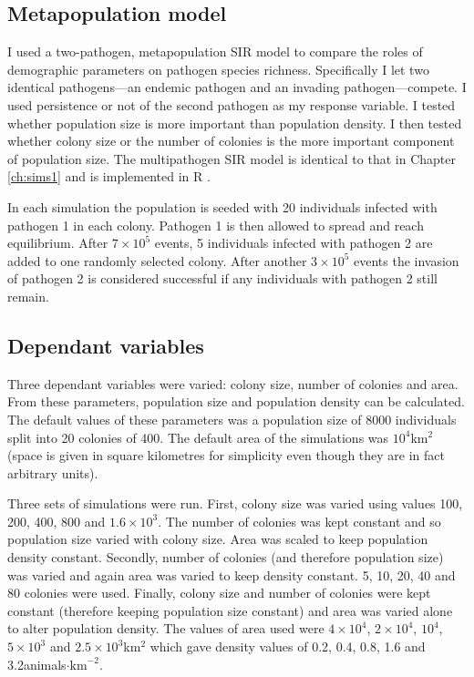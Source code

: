 \subsection{Metapopulation model}



I used a two-pathogen, metapopulation SIR model to compare the roles of demographic parameters on pathogen species richness.
Specifically I let two identical pathogens---an endemic pathogen and an invading pathogen---compete.
I used persistence or not of the second pathogen as my response variable.
I tested whether population size is more important than population density.
I then tested whether colony size or the number of colonies is the more important component of population size.
The multipathogen SIR model is identical to that in Chapter \ref{ch:sims1} and is implemented in R \cite{R}.



In each simulation the population is seeded with 20 individuals infected with pathogen 1 in each colony. 
Pathogen 1 is then allowed to spread and reach equilibrium. 
After \ensuremath{7\times 10^{5}} events, 5 individuals infected with pathogen 2 are added to one randomly selected colony. 
After another \ensuremath{3\times 10^{5}} events the invasion of pathogen 2 is considered successful if any individuals with pathogen 2 still remain.

\subsection{Dependant variables}

Three dependant variables were varied: colony size, number of colonies and area.
From these parameters, population size and population density can be calculated.
The default values of these parameters was a population size of 8000 individuals split into 20 colonies of 400.
The default area of the simulations was \ensuremath{10^{4}}km$^2$ (space is given in square kilometres for simplicity even though they are in fact arbitrary units).

Three sets of simulations were run.
First, colony size was varied using values 100, 200, 400, 800 and \ensuremath{1.6\times 10^{3}}.
The number of colonies was kept constant and so population size varied with colony size.
Area was scaled to keep population density constant. 
Secondly, number of colonies (and therefore population size) was varied and again area was varied to keep density constant.
5, 10, 20, 40 and 80 colonies were used.
Finally, colony size and number of colonies were kept constant (therefore keeping population size constant) and area was varied alone to alter population density. 
The values of area used were \ensuremath{4\times 10^{4}}, \ensuremath{2\times 10^{4}}, \ensuremath{10^{4}}, \ensuremath{5\times 10^{3}} and \ensuremath{2.5\times 10^{3}}km$^2$ which gave density values of 0.2, 0.4, 0.8, 1.6 and 3.2animals$\cdot\text{km}^{-2}$.

